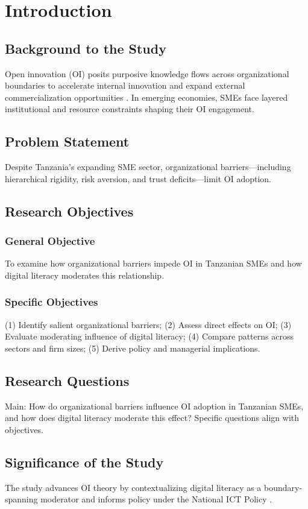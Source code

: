 \chapter{Introduction}
\section{Background to the Study}
Open innovation (OI) posits purposive knowledge flows across organizational boundaries to accelerate internal innovation and expand external commercialization opportunities \parencite{chesbrough2003,west_bogers_2014}. In emerging economies, SMEs face layered institutional and resource constraints shaping their OI engagement.

\section{Problem Statement}
Despite Tanzania's expanding SME sector, organizational barriers---including hierarchical rigidity, risk aversion, and trust deficits---limit OI adoption.

\section{Research Objectives}
\subsection{General Objective}
To examine how organizational barriers impede OI in Tanzanian SMEs and how digital literacy moderates this relationship.
\subsection{Specific Objectives}
(1) Identify salient organizational barriers; (2) Assess direct effects on OI; (3) Evaluate moderating influence of digital literacy; (4) Compare patterns across sectors and firm sizes; (5) Derive policy and managerial implications.

\section{Research Questions}
Main: How do organizational barriers influence OI adoption in Tanzanian SMEs, and how does digital literacy moderate this effect? Specific questions align with objectives.

\section{Significance of the Study}
The study advances OI theory by contextualizing digital literacy as a boundary-spanning moderator and informs policy under the National ICT Policy \parencite{tz_national_ict_policy}.

